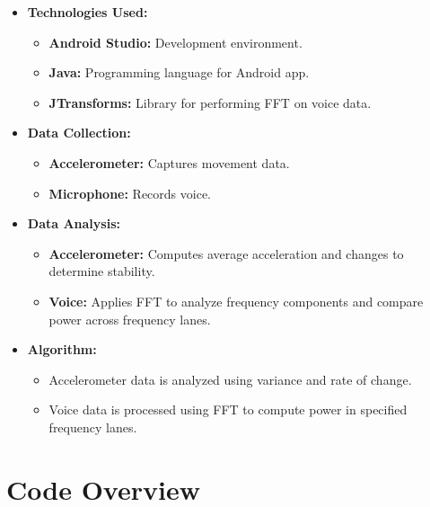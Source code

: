 \documentclass[12pt,a4paper]{article}
\begin{document}
\begin{itemize}
    \item \textbf{Technologies Used:}
    \begin{itemize}
        \item \textbf{Android Studio:} Development environment.
        \item \textbf{Java:} Programming language for Android app.
        \item \textbf{JTransforms:} Library for performing FFT on voice data.
    \end{itemize}
    \item \textbf{Data Collection:}
    \begin{itemize}
        \item \textbf{Accelerometer:} Captures movement data.
        \item \textbf{Microphone:} Records voice.
    \end{itemize}
    \item \textbf{Data Analysis:}
    \begin{itemize}
        \item \textbf{Accelerometer:} Computes average acceleration and changes to determine stability.
        \item \textbf{Voice:} Applies FFT to analyze frequency components and compare power across frequency lanes.
    \end{itemize}
    \item \textbf{Algorithm:}
    \begin{itemize}
        \item Accelerometer data is analyzed using variance and rate of change.
        \item Voice data is processed using FFT to compute power in specified frequency lanes.
    \end{itemize}
\end{itemize}

\section{Code Overview}
\end{document}

